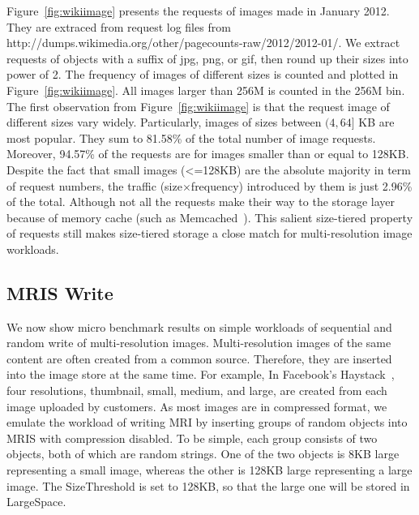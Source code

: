 Figure~\ref{fig:wikiimage} presents the requests of images made in
January 2012. They are extraced from request log files from
http://dumps.wikimedia.org/other/pagecounts-raw/2012/2012-01/. We
extract requests of objects with a suffix of jpg, png, or gif, then
round up their sizes into power of 2. The frequency of images of
different sizes is counted and plotted in Figure~\ref{fig:wikiimage}.
All images larger than 256M is counted in the 256M bin. The first
observation from Figure~\ref{fig:wikiimage} is that the request image
of different sizes vary widely.  Particularly, images of sizes between
$(4, 64]$ KB are most popular. They sum to 81.58\% of the total number
of image requests. Moreover, 94.57\% of the requests are for images
smaller than or equal to 128KB. Despite the fact that small images
(<=128KB) are the absolute majority in term of request numbers, the
traffic (size$\times$frequency) introduced by them is just 2.96\% of
the total. Although not all the requests make their way to the storage
layer because of memory cache (such as Memcached~\cite{memcached}).
This salient size-tiered property of requests still makes size-tiered
storage a close match for multi-resolution image workloads.

\subsection{MRIS Write}



We now show micro benchmark results on simple workloads of sequential
and random write of multi-resolution images. Multi-resolution images
of the same content are often created from a common source. Therefore,
they are inserted into the image store at the same time. For example,
In Facebook's Haystack~\cite{beaver2010finding}, four resolutions,
thumbnail, small, medium, and large, are created from each image
uploaded by customers. As most images are in compressed format, we
emulate the workload of writing MRI by inserting groups of random
objects into MRIS with compression disabled. To be simple, each group
consists of two objects, both of which are random strings. One of the
two objects is 8KB large representing a small image, whereas the other
is 128KB large representing a large image. The SizeThreshold is set to
128KB, so that the large one will be stored in LargeSpace.

